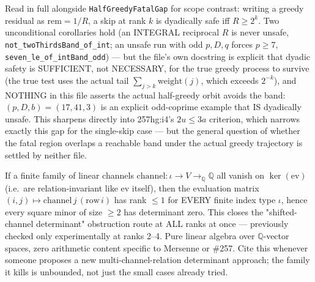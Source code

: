 \begin{obs}
Read in full alongside \texttt{HalfGreedyFatalGap} for scope contrast: writing a greedy residual
as $\mathrm{rem}=1/R$, a skip at rank $k$ is dyadically safe iff $R\ge2^k$. Two unconditional
corollaries hold (an INTEGRAL reciprocal $R$ is never unsafe, \texttt{not\_twoThirdsBand\_of\_int};
an unsafe run with odd $p,D,q$ forces $p\ge7$, \texttt{seven\_le\_of\_intBand\_odd}) — but the
file's own docstring is explicit that dyadic safety is SUFFICIENT, not NECESSARY, for the true
greedy process to survive (the true test uses the actual tail $\sum_{j>k}\mathrm{weight}(j)$,
which exceeds $2^{-k}$), and NOTHING in this file asserts the actual half-greedy orbit avoids
the band: $(p,D,b)=(17,41,3)$ is an explicit odd-coprime example that IS dyadically unsafe. This
sharpens directly into 257hg:i4's $2u\le3a$ criterion, which narrows exactly this gap for the
single-skip case — but the general question of whether the fatal region overlaps a reachable
band under the actual greedy trajectory is settled by neither file.
\par\noindent{}     
\end{obs}

\begin{thm}
If a finite family of linear channels $\mathrm{channel}:\iota\to V\to_{\mathbb{Q}}\mathbb{Q}$ all
vanish on $\ker(\mathrm{ev})$ (i.e.\ are relation-invariant like $\mathrm{ev}$ itself), then the
evaluation matrix $(i,j)\mapsto\mathrm{channel}\,j\,(\mathrm{row}\,i)$ has rank $\le1$ for EVERY
finite index type $\iota$, hence every square minor of size $\ge2$ has determinant zero. This
closes the "shifted-channel determinant" obstruction route at ALL ranks at once — previously
checked only experimentally at ranks 2--4. Pure linear algebra over $\mathbb{Q}$-vector spaces,
zero arithmetic content specific to Mersenne or \#257. Cite this whenever someone proposes a new
multi-channel-relation determinant approach; the family it kills is unbounded, not just the
small cases already tried.
\par\noindent{}   
\end{thm}

